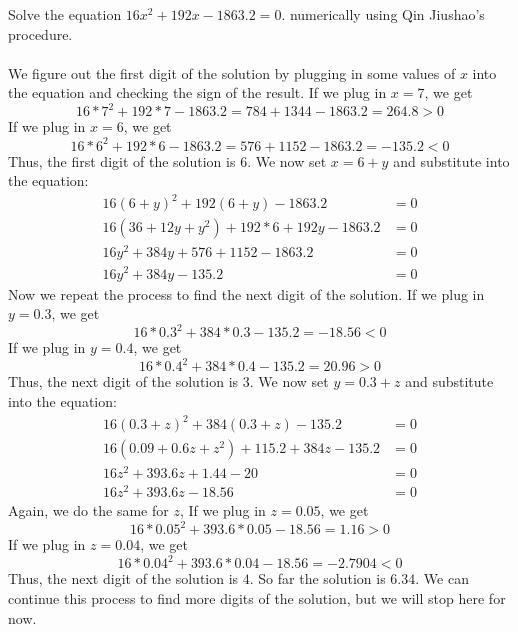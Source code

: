 \documentclass[12pt]{exam}
\begin{document}
\begin{questions}
\newpage
\question 
Solve the equation $16x^2 + 192x -1863.2=0$.
numerically
using Qin Jiushao's procedure.
\\\\
We figure out the first digit of the solution by plugging in 
some values of $x$ into the equation and checking the sign 
of the result. 
If we plug in $x=7$, we get 
\[
16*7^2 + 192*7 -1863.2 = 784 + 1344 - 1863.2 = 264.8 > 0
\]
If we plug in $x=6$, we get 
\[
16*6^2 + 192*6 -1863.2 = 576 + 1152 - 1863.2 = -135.2 < 0
\]
Thus, the first digit of the solution is $6$.
We now set $x= 6 + y$ and substitute into the equation:
\begin{align*}
16(6+y)^2 + 192(6+y) -1863.2 &= 0\\
16(36 + 12y + y^2) + 192*6 + 192y -1863.2 &= 0\\
16y^2 + 384y + 576 + 1152 - 1863.2 &= 0\\
16y^2 + 384y - 135.2 &= 0
\end{align*}
Now we repeat the process to find the next digit of the solution.
If we plug in $y=0.3$, we get
\[
16*0.3^2 + 384*0.3 - 135.2 = -18.56 <0
\]
If we plug in $y=0.4$, we get
\[
16*0.4^2 + 384*0.4 - 135.2 = 20.96 >0
\]
Thus, the next digit of the solution is $3$.
We now set $y = 0.3 + z$ and substitute into the equation:
\begin{align*}
16(0.3+z)^2 + 384(0.3+z) - 135.2 &= 0\\
16(0.09 + 0.6z + z^2) + 115.2 + 384z - 135.2 &= 0\\
16z^2 + 393.6z + 1.44 - 20 &= 0\\
16z^2 + 393.6z - 18.56 &= 0
\end{align*}
Again, we do the same for $z$,
If we plug in $z= 0.05$, we get
\[
16*0.05^2 + 393.6*0.05 - 18.56 = 1.16 > 0
\]
If we plug in $z= 0.04$, we get
\[
16*0.04^2 + 393.6*0.04 - 18.56 = -2.7904 < 0
\]
Thus, the next digit of the solution is $4$.
So far the solution is $6.34$. We can continue 
this process to find more digits of the solution, 
but we will stop here for now.


\end{questions}
\end{document}
